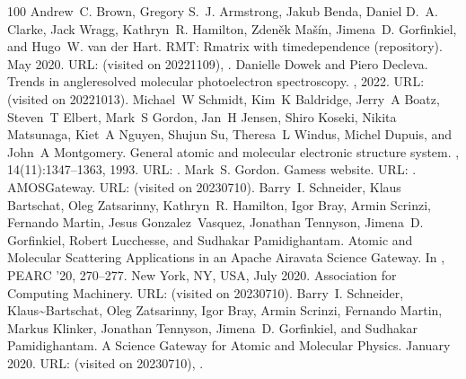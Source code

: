 \documentclass[letterpaper,table,10pt,english]{jupyterBook}
\begin{document}
\begin{sphinxthebibliography}{100}
\sphinxAtStartPar
Andrew C. Brown, Gregory S. J. Armstrong, Jakub Benda, Daniel D. A. Clarke, Jack Wragg, Kathryn R. Hamilton, Zdeněk Mašín, Jimena D. Gorfinkiel, and Hugo W. van der Hart. RMT: R\sphinxhyphen{}matrix with time\sphinxhyphen{}dependence (repository). May 2020. URL:  (visited on 2022\sphinxhyphen{}11\sphinxhyphen{}09), .
\sphinxAtStartPar
Danielle Dowek and Piero Decleva. Trends in angle\sphinxhyphen{}resolved molecular photoelectron spectroscopy. , 2022. URL:  (visited on 2022\sphinxhyphen{}10\sphinxhyphen{}13).
\sphinxAtStartPar
Michael W Schmidt, Kim K Baldridge, Jerry A Boatz, Steven T Elbert, Mark S Gordon, Jan H Jensen, Shiro Koseki, Nikita Matsunaga, Kiet A Nguyen, Shujun Su, Theresa L Windus, Michel Dupuis, and John A Montgomery. General atomic and molecular electronic structure system. , 14(11):1347–1363, 1993. URL: .
\sphinxAtStartPar
Mark S. Gordon. Gamess website. URL: .
\sphinxAtStartPar
AMOSGateway. URL:  (visited on 2023\sphinxhyphen{}07\sphinxhyphen{}10).
\sphinxAtStartPar
Barry I. Schneider, Klaus Bartschat, Oleg Zatsarinny, Kathryn R. Hamilton, Igor Bray, Armin Scrinzi, Fernando Martin, Jesus Gonzalez Vasquez, Jonathan Tennyson, Jimena D. Gorfinkiel, Robert Lucchesse, and Sudhakar Pamidighantam. Atomic and Molecular Scattering Applications in an Apache Airavata Science Gateway. In , PEARC '20, 270–277. New York, NY, USA, July 2020. Association for Computing Machinery. URL:  (visited on 2023\sphinxhyphen{}07\sphinxhyphen{}10).
\sphinxAtStartPar
Barry I. Schneider, Klaus\textasciitilde{}Bartschat, Oleg Zatsarinny, Igor Bray, Armin Scrinzi, Fernando Martin, Markus Klinker, Jonathan Tennyson, Jimena D. Gorfinkiel, and Sudhakar Pamidighantam. A Science Gateway for Atomic and Molecular Physics. January 2020. URL:  (visited on 2023\sphinxhyphen{}07\sphinxhyphen{}10), .

\end{sphinxthebibliography}
\end{document}

